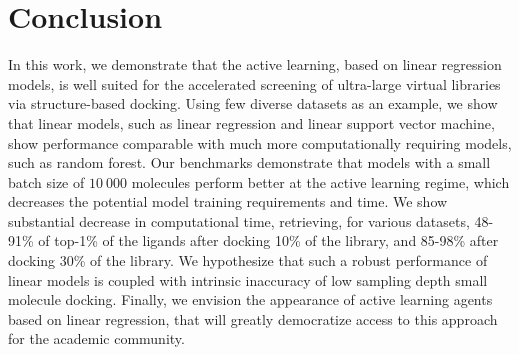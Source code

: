 \section{Conclusion}

In this work, we demonstrate that the active learning, based on linear regression models, is well suited for the accelerated screening of ultra-large virtual libraries via structure-based docking. Using few diverse datasets as an example, we show that linear models, such as linear regression and linear support vector machine, show performance comparable with much more computationally requiring models, such as random forest. Our benchmarks demonstrate that models with a small batch size of $10\ 000$ molecules perform better at the active learning regime, which decreases the potential model training requirements and time. We show substantial decrease in computational time, retrieving, for various datasets, 48-91\% of top-1\% of the ligands after docking 10\% of the library, and 85-98\% after docking 30\% of the library. We hypothesize that such a robust performance of linear models is coupled with intrinsic inaccuracy of low sampling depth small molecule docking. Finally, we envision the appearance of active learning agents based on linear regression, that will greatly democratize access to this approach for the academic community. 